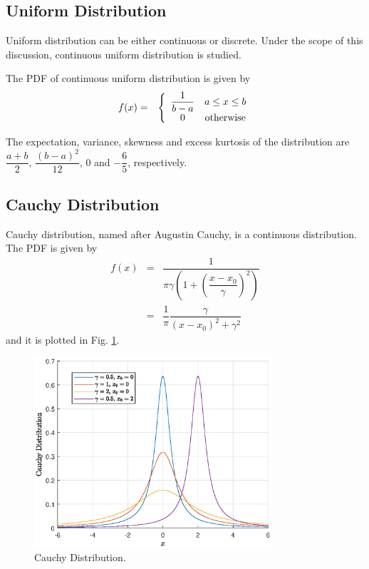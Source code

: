 \subsection{Uniform Distribution}

Uniform distribution can be either continuous or discrete. Under the scope of this discussion, continuous uniform distribution is studied.

The PDF of continuous uniform distribution is given by
\begin{eqnarray}
  f(x) &=& \left\{\begin{array}{cc}
                    \dfrac{1}{b-a} & a \leq x \leq b \\
                    0 & \textup{otherwise}
                  \end{array}\right. \nonumber
\end{eqnarray}

The expectation, variance, skewness and excess kurtosis of the distribution are $\dfrac{a+b}{2}$, $\dfrac{(b-a)^2}{12}$, $0$ and $-\dfrac{6}{5}$, respectively.

\subsection{Cauchy Distribution}

Cauchy distribution, named after Augustin Cauchy, is a continuous distribution. The PDF is given by
\begin{eqnarray}
  f(x) &=& \dfrac{1}{\pi\gamma\left(1+\left(\dfrac{x-x_0}{\gamma}\right)^2\right)} \nonumber \\ &=& \dfrac{1}{\pi}\dfrac{\gamma}{(x-x_0)^2+\gamma^2} \nonumber
\end{eqnarray}
and it is plotted in Fig. \ref{fig:cauchy_pdf}.

\begin{figure}[!htb]
	\centering
	\includegraphics[width=250pt]{chapters/part-1/figures/cauchy_pdf.eps}
	\caption{Cauchy Distribution.} \label{fig:cauchy_pdf}
\end{figure}

